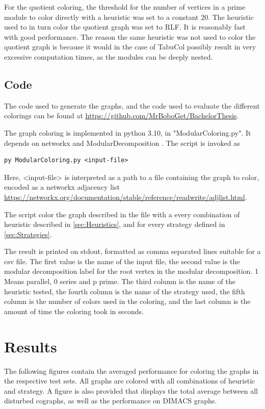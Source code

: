 \documentclass[a4paper]{article}
\begin{document}
For the quotient coloring, the threshold for the number of vertices in a prime
module to color directly with a heuristic was set to a constant 20. The
heuristic used to in turn color the quotient graph was set to RLF. It is
reasonably fast with good performance. The reason the same heuristic was not
used to color the quotient graph is because it would in the case of TabuCol
possibly result in very excessive computation times, as the modules can be
deeply nested.


\subsection{Code}

The code used to generate the graphs, and the code used to evaluate the
different colorings can be found at
\url{https://github.com/MrBoboGet/BachelorThesis}.

The graph coloring is implemented in python 3.10, in "ModularColoring.py". 
It depends on networkx \cite{Networkx} and ModularDecomposition \cite{Anna}.
The script is invoked as 
\begin{verbatim}
py ModularColoring.py <input-file> 
\end{verbatim}

Here, <input-file> is interpreted as a path to a file containing the graph to color,
encoded as a networkx adjacency list \url{https://networkx.org/documentation/stable/reference/readwrite/adjlist.html}.

The script color the graph described in the file with a every combination of 
heuristic described in \autoref{sec:Heuristics}, and for every strategy 
defined in \autoref{sec:Strategies}.

The result is printed on stdout, formatted as comma separated lines suitable for
a csv file. The first value is the name of the input file, the second value is
the modular decomposition label for the root vertex in the modular
decomposition. 1 Means parallel, 0 series and p prime.  The third column is the
name of the heuristic tested, the fourth column is the name of the strategy
used, the fifth column is the number of colors used in the coloring, and the
last column is the amount of time the coloring took in seconds. 

\section{Results}
\label{sec:Result}

The following figures contain the averaged performance for coloring the graphs in the
respective test sets. All graphs are colored with all combinations of heuristic
and strategy. A figure is also provided that displays the total average between
all disturbed cographs, as well as the performance on DIMACS graphs. 
\end{document}
